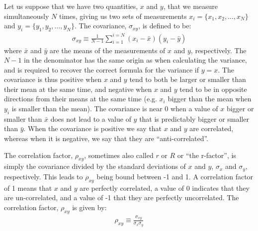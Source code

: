 Let us suppose that we have two quantities, $x$ and $y$, that we measure simultaneously $N$ times, giving us two sets of measurements  $x_i=\{x_1, x_2,\dots, x_N\}$ and $y_i=\{y_1, y_2,\dots, y_N\}$. The covariance, $\sigma_{xy}$, is defined to be:
\begin{align}
\sigma_{xy}\equiv\frac{1}{N-1}\sum_{i=1}^{i=N}(x_i-\bar x)(y_i-\bar y)
\end{align}
where $\bar x$ and $\bar y$ are the means of the measurements of $x$ and $y$, respectively. The $N-1$ in the denominator has the same origin as when calculating the variance, and is required to recover the correct formula for the variance if $y=x$. The covariance is thus positive when $x$ and $y$ tend to both be larger or smaller than their mean at the same time, and negative when $x$ and $y$ tend to be in opposite directions from their means at the same time (e.g. $x_i$ bigger than the mean when $y_i$ is smaller than the mean). The covariance is near 0 when a value of $x$ bigger or smaller than $\bar x$ does not lead to a value of $y$ that is predictably bigger or smaller than $\bar y$. When the covariance is positive we say that $x$ and $y$ are correlated, whereas when it is negative, we say that they are ``anti-correlated''.

The correlation factor, $\rho_{xy}$, sometimes also called $r$ or $R$ or ``the r-factor'', is simply the covariance divided by the standard deviations of $x$ and $y$, $\sigma_x$ and $\sigma_y$, respectively. This leads to $\rho_{xy}$ being bound between -1 and 1. A correlation factor of 1 means that $x$ and $y$ are perfectly correlated, a value of 0 indicates that they are un-correlated, and a value of -1 that they are perfectly uncorrelated. The correlation factor, $\rho_{xy}$ is given by:
\begin{align}
\rho_{xy}\equiv\frac{\sigma_{xy}}{\sigma_x\sigma_y}
\end{align}

